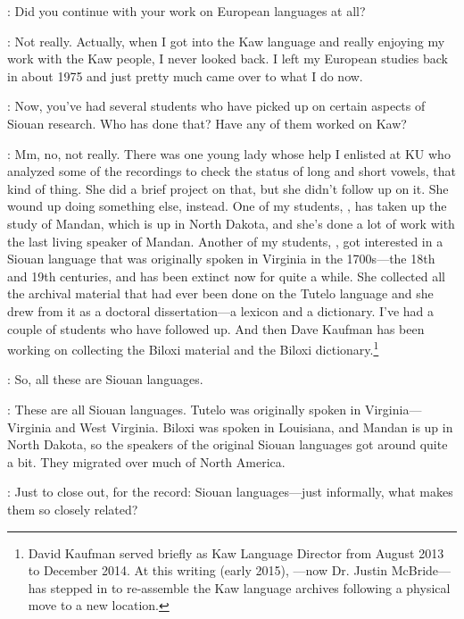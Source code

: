 \documentclass[output=paper]{LSP/langsci}
\begin{document}
: Did you continue with your work on European languages at all?

: Not really. Actually, when I got into the Kaw language and really enjoying my work with the Kaw people, I never looked back. I left my European studies back in about 1975 and just pretty much came over to what I do now.

: Now, you've had several students who have picked up on certain aspects of Siouan research. Who has done that? Have any of them worked on Kaw?

: Mm, no, not really. There was one young lady whose help I enlisted at KU who analyzed some of the recordings to check the status of long and short vowels, that kind of thing. She did a brief project on that, but she didn't follow up on it. She wound up doing something else, instead. One of my students, , has taken up the study of Mandan, which is up in North Dakota, and she's done a lot of work with the last living speaker of Mandan. Another of my students, , got interested in a Siouan language that was originally spoken in Virginia in the 1700s---the 18th and 19th centuries, and has been extinct now for quite a while. She collected all the archival material that had ever been done on the Tutelo language and she drew from it as a doctoral dissertation---a lexicon and a dictionary. I've had a couple of students who have followed up. And then Dave Kaufman has been working on collecting the Biloxi material and the Biloxi dictionary.\footnote{David Kaufman served briefly as Kaw Language Director from August 2013 to December 2014. At this writing (early 2015),  ---now Dr. Justin McBride--- has stepped in to re-assemble the Kaw language archives following a physical move to a new location.}

: So, all these are Siouan languages.

: These are all Siouan languages. Tutelo was originally spoken in Virginia---Virginia and West Virginia. Biloxi was spoken in Louisiana, and Mandan is up in North Dakota, so the speakers of the original Siouan languages got around quite a bit. They migrated over much of North America.

: Just to close out, for the record: Siouan languages---just informally, what makes them so closely related?
\end{document}
